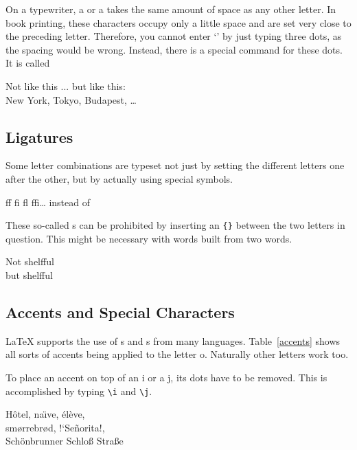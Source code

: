 On a typewriter, a  or a  takes the same amount of
space as any other letter. In book printing, these characters occupy
only a little space and are set very close to the preceding letter.
Therefore, you cannot enter `' by just typing three
dots, as the spacing would be wrong. Instead, there is a special
command for these dots. It is called

\begin{lscommand}
\end{lscommand}


\begin{example}
Not like this ... but like this:\\
New York, Tokyo, Budapest, \ldots
\end{example}
 
\subsection{Ligatures}

Some letter combinations are typeset not just by setting the
different letters one after the other, but by actually using special
symbols.
\begin{code}
{\large ff fi fl ffi\ldots}\quad
instead of
\end{code}
These so-called s can be prohibited by inserting an \verb|{}|
between the two letters in question. This might be necessary with
words built from two words.

\begin{example}
\Large Not shelfful\\
but shelf\mbox{}ful
\end{example}
 
\subsection{Accents and Special Characters}
 
\LaTeX{} supports the use of s and s
from many languages. Table~\ref{accents} shows all sorts of accents
being applied to the letter o. Naturally other letters work too.

To place an accent on top of an i or a j, its dots have to be
removed. This is accomplished by typing \verb|\i| and \verb|\j|.

\begin{example}
H\^otel, na\"\i ve, \'el\`eve,\\ 
sm\o rrebr\o d, !`Se\~norita!,\\
Sch\"onbrunner Schlo\ss{} 
Stra\ss e
\end{example}

